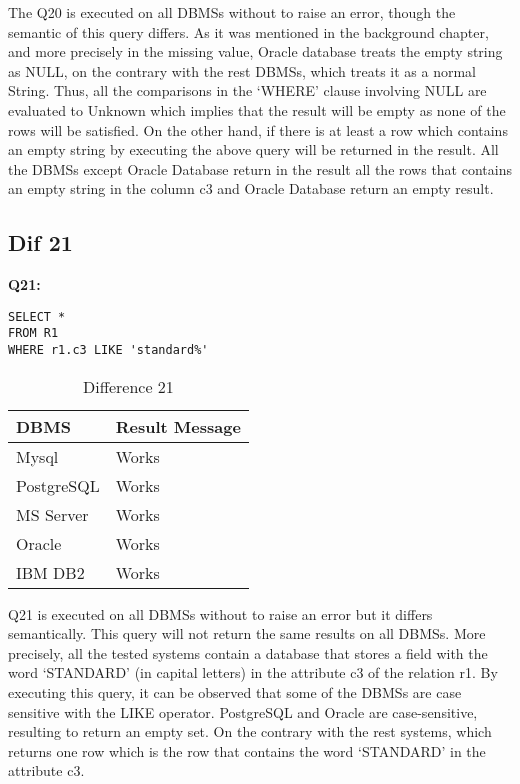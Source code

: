 The Q20 is executed on all DBMSs without to raise an error, though the semantic of this query differs. As it was mentioned in the background chapter, and more precisely in the missing value, Oracle database treats the empty string as NULL, on the contrary with the rest DBMSs, which treats it as a normal String. Thus, all the comparisons in the ‘WHERE’ clause involving NULL are evaluated to Unknown which implies that the result will be empty as none of the rows will be satisfied.  On the other hand, if there is at least a row which contains an empty string by executing the above query will be returned in the result. All the DBMSs except Oracle Database return in the result all the rows that contains an empty string in the column c3 and Oracle Database return an empty result. 



\subsection{Dif 21}

\textbf{Q21:}
\begin{mdframed}[backgroundcolor=lightgray!20]
\begin{lstlisting}[style=SQL]
SELECT *
FROM R1
WHERE r1.c3 LIKE 'standard%'
\end{lstlisting}
\end{mdframed}


\begin{table}[h]
\centering
\caption{Difference 21}
\label{my-label}
\begin{tabular}{|p{2cm}|p{11.5cm}| }
\hline
\textbf{DBMS} & \textbf{Result Message} \\ \hline
Mysql         & Works                   \\ \hline
PostgreSQL    & Works                   \\ \hline
MS Server     & Works                   \\ \hline
Oracle        & Works                   \\ \hline
IBM DB2       & Works                   \\ \hline
\end{tabular}
\end{table}

Q21 is executed on all DBMSs without to raise an error but it differs semantically.  This query will not return the same results on all DBMSs. More precisely, all the tested systems contain a database that stores a field with the word ‘STANDARD’ (in capital letters) in the attribute c3 of the relation r1. By executing this query, it can be observed that some of the DBMSs are case sensitive with the LIKE operator. PostgreSQL and Oracle are case-sensitive, resulting to return an empty set. On the contrary with the rest systems, which returns one row which is the row that contains the word ‘STANDARD’ in the attribute c3.  




